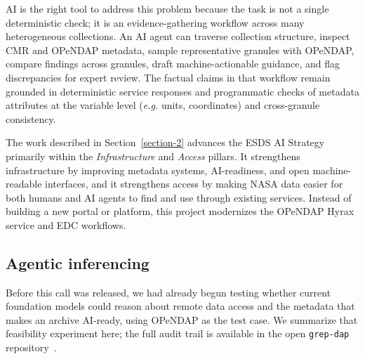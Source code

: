 \documentclass[11pt]{article}
\begin{document}
\ac{AI} is the right tool to address this problem because the task is not a
single deterministic check; it is an evidence-gathering workflow across many
heterogeneous collections. An \ac{AI} agent can traverse collection structure, inspect
\ac{CMR} and \acs{OPeNDAP} metadata, sample representative granules with
\acs{OPeNDAP}, compare findings across granules, draft machine-actionable
guidance, and flag discrepancies for expert review. The factual claims in that
workflow remain grounded in deterministic service responses and programmatic
checks of metadata attributes at the variable level (\textit{e.g.} units, coordinates) and
cross-granule consistency.

The work described in Section~\ref{section-2} advances the \ac{ESDS} \ac{AI} Strategy
primarily within the {\em Infrastructure} and {\em Access} pillars. It strengthens
infrastructure by improving metadata systems, \ac{AI}-readiness, and open
machine-readable interfaces, and it strengthens access by making NASA data
easier for both humans and \ac{AI} agents to find and use through existing
services. Instead of building a new portal or platform, this project modernizes
the \acs{OPeNDAP} Hyrax service and \ac{EDC} workflows.

\subsection{Agentic inferencing}
\label{section-1.1}

Before this call was released, we had already begun testing whether current
foundation models could reason about remote data access and the metadata that
makes an archive \ac{AI}-ready, using \acs{OPeNDAP} as the test case. We
summarize that feasibility experiment here; the full audit trail is available
in the open \texttt{grep-dap} repository~\cite{cornillon-grepdap-2026}.
\end{document}
